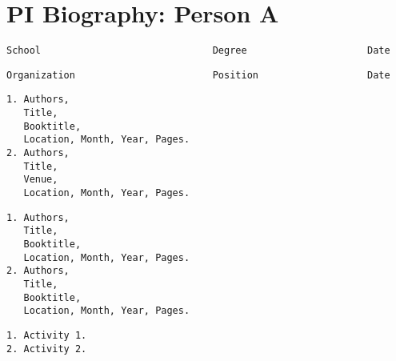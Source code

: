 \section*{PI Biography: Person A}
%
{}
%
\begin{verbatim}
School                              Degree                     Date
\end{verbatim}


\begin{verbatim}
Organization                        Position                   Date
\end{verbatim}


\begin{verbatim}
1. Authors,
   Title,
   Booktitle,
   Location, Month, Year, Pages.
2. Authors,
   Title,
   Venue,
   Location, Month, Year, Pages.
\end{verbatim}


\begin{verbatim}
1. Authors,
   Title,
   Booktitle,
   Location, Month, Year, Pages.
2. Authors,
   Title,
   Booktitle,
   Location, Month, Year, Pages.
\end{verbatim}


\begin{verbatim}
1. Activity 1.
2. Activity 2.
\end{verbatim}

